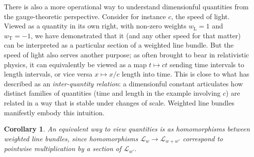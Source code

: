 \documentclass[12pt]{article}
\numberwithin{equation}{section}
\newtheorem{corollary}[theorem]{Corollary}
\begin{document}
There is also a more operational way to understand dimensionful quantities from the gauge-theoretic perspective. Consider for instance $c$, the speed of light. Viewed as a quantity in its own right, with non-zero weights $w_\mathrm{L}=1$ and $w_\mathrm{T}=-1$, we have demonstrated that it (and any other speed for that matter) can be interpreted as a particular section of a weighted line bundle. But the speed of light also serves another purpose; as often brought to bear in relativistic physics, it can equivalently be viewed as a map $t\mapsto ct$ sending time intervals to length intervals, or vice versa $x\mapsto x/c$ length into time. This is close to what \citet{Jacobs2022} has described as an \emph{inter-quantity relation}: a dimensionful constant articulates how distinct families of quantities (time and length in the example involving $c$) are related in a way that is stable under changes of scale. Weighted line bundles manifestly embody this intuition.

\begin{corollary}
    An equivalent way to view quantities is as homomorphisms between weighted line bundles, since homomorphisms $\mathcal{L}_{w}\to \mathcal{L}_{w+w'}$ correspond to pointwise multiplication by a section of $\mathcal{L}_{w
        '}$.
\end{corollary}
\end{document}
